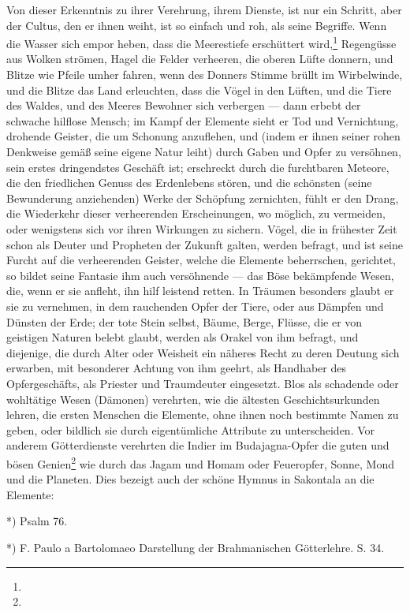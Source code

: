 \documentclass[a4paper, 11pt, oneside, polutonikogreek, german]{article}
\begin{document}
Von dieser Erkenntnis zu ihrer Verehrung, ihrem Dienste, ist nur ein Schritt, aber der Cultus, den er ihnen weiht, ist so einfach und roh, als seine Begriffe. Wenn die Wasser sich empor heben, dass die Meerestiefe erschüttert wird,\footnote{} Regengüsse aus Wolken strömen, Hagel die Felder verheeren, die oberen Lüfte donnern, und Blitze wie Pfeile umher fahren, wenn des Donners Stimme brüllt im Wirbelwinde, und die Blitze das Land erleuchten, dass die Vögel in den Lüften, und die Tiere des Waldes, und des Meeres Bewohner sich verbergen --- dann erbebt der schwache hilflose Mensch; im Kampf der Elemente sieht er Tod und Vernichtung, drohende Geister, die um Schonung anzuflehen, und (indem er ihnen seiner rohen Denkweise gemäß seine eigene Natur leiht) durch Gaben und Opfer zu versöhnen, sein erstes dringendstes Geschäft ist; erschreckt durch die furchtbaren Meteore, die den friedlichen Genuss des Erdenlebens stören, und die schönsten (seine Bewunderung anziehenden) Werke der Schöpfung zernichten, fühlt er den Drang, die Wiederkehr dieser verheerenden Erscheinungen, wo möglich, zu vermeiden, oder wenigstens sich vor ihren Wirkungen zu sichern. Vögel, die in frühester Zeit schon als Deuter und Propheten der Zukunft galten, werden befragt, und ist seine Furcht auf die verheerenden Geister, welche die Elemente beherrschen, gerichtet, so bildet seine Fantasie ihm auch versöhnende --- das Böse bekämpfende Wesen, die, wenn er sie anfleht, ihn hilf leistend retten. In Träumen besonders glaubt er sie zu vernehmen, in dem rauchenden Opfer der Tiere, oder aus Dämpfen und Dünsten der Erde; der tote Stein selbst, Bäume, Berge, Flüsse, die er von geistigen Naturen belebt glaubt, werden als Orakel von ihm befragt, und diejenige, die durch Alter oder Weisheit ein näheres Recht zu deren Deutung sich erwarben, mit besonderer Achtung von ihm geehrt, als Handhaber des Opfergeschäfts, als Priester und Traumdeuter eingesetzt. Blos als schadende oder wohltätige Wesen (Dämonen) verehrten, wie die ältesten Geschichtsurkunden lehren, die ersten Menschen die Elemente, ohne ihnen noch bestimmte Namen zu geben, oder bildlich sie durch eigentümliche Attribute zu unterscheiden. Vor anderem Götterdienste verehrten die Indier im Budajagna-Opfer die guten und bösen Genien\footnote{} wie durch das Jagam und Homam oder Feueropfer, Sonne, Mond und die Planeten. Dies bezeigt auch der schöne Hymnus in Sakontala an die Elemente:

*) Psalm 76.

*) F. Paulo a Bartolomaeo Darstellung der Brahmanischen Götterlehre. S. 34.
\end{document}

